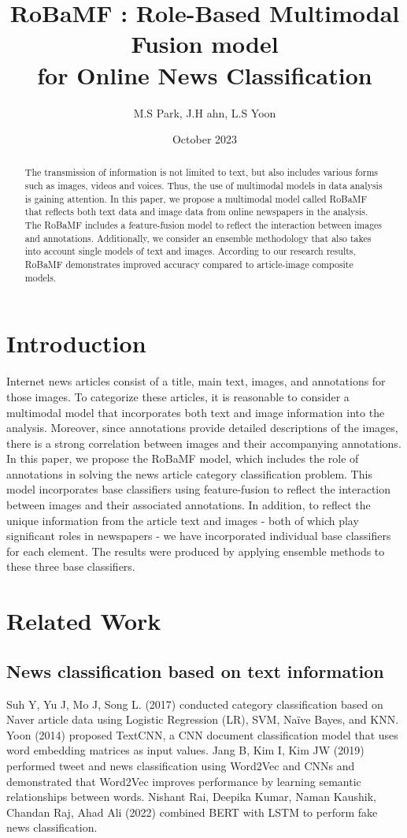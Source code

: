 \documentclass{article}
\title{RoBaMF : Role-Based Multimodal Fusion model\\
for Online News Classification}
\author{M.S Park, J.H ahn, L.S Yoon}
\date{October 2023}
\begin{document}
\maketitle

\begin{abstract}
  The transmission of information is not limited to text, but also includes various forms such as images, videos and voices. Thus, the use of multimodal models in data analysis is gaining attention. In this paper, we propose a multimodal model called RoBaMF that reflects both text data and image data from online newspapers in the analysis. The RoBaMF includes a feature-fusion model to reflect the interaction between images and annotations. Additionally, we consider an ensemble methodology that also takes into account single models of text and images. According to our research results, RoBaMF demonstrates improved accuracy compared to article-image composite models.
\end{abstract}

\section{Introduction}
Internet news articles consist of a title, main text, images, and annotations for those images. To categorize these articles, it is reasonable to consider a multimodal model that incorporates both text and image information into the analysis. Moreover, since annotations provide detailed descriptions of the images, there is a strong correlation between images and their accompanying annotations. In this paper, we propose the RoBaMF model, which includes the role of annotations in solving the news article category classification problem. This model incorporates base classifiers using feature-fusion to reflect the interaction between images and their associated annotations. In addition, to reflect the unique information from the article text and images - both of which play significant roles in newspapers - we have incorporated individual base classifiers for each element. The results were produced by applying ensemble methods to these three base classifiers.



\section{Related Work}
\subsection{News classification based on text information}
Suh Y, Yu J, Mo J, Song L. (2017) conducted category classification based on Naver article data using Logistic Regression (LR), SVM, Naïve Bayes, and KNN. Yoon (2014) proposed TextCNN, a CNN document classification model that uses word embedding matrices as input values.\cite{suh2017comparison} Jang B, Kim I, Kim JW (2019) performed tweet and news classification using Word2Vec and CNNs and demonstrated that Word2Vec improves performance by learning semantic relationships between words.\cite{jang2019word2vec} Nishant Rai, Deepika Kumar, Naman Kaushik, Chandan Raj, Ahad Ali (2022) combined BERT with LSTM to perform fake news classification.\cite{rai2022fake}
\end{document}
